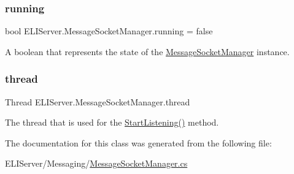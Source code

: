 \subsubsection{\texorpdfstring{running}{running}}
{\footnotesize\ttfamily bool E\+L\+I\+Server.\+Message\+Socket\+Manager.\+running = false\hspace{0.3cm}{\ttfamily [private]}}



A boolean that represents the state of the \hyperlink{class_e_l_i_server_1_1_message_socket_manager}{Message\+Socket\+Manager} instance. 

\mbox{\label{class_e_l_i_server_1_1_message_socket_manager_a2c6114a87afeb4ecb1cbf42daea68df0}} 
\subsubsection{\texorpdfstring{thread}{thread}}
{\footnotesize\ttfamily Thread E\+L\+I\+Server.\+Message\+Socket\+Manager.\+thread\hspace{0.3cm}{\ttfamily [private]}}



The thread that is used for the \hyperlink{class_e_l_i_server_1_1_message_socket_manager_ab5d2f61a349046960ae63303ff1c2130}{Start\+Listening()} method. 



The documentation for this class was generated from the following file\+:\begin{DoxyCompactItemize}
\item 
E\+L\+I\+Server/\+Messaging/\hyperlink{_message_socket_manager_8cs}{Message\+Socket\+Manager.\+cs}\end{DoxyCompactItemize}
